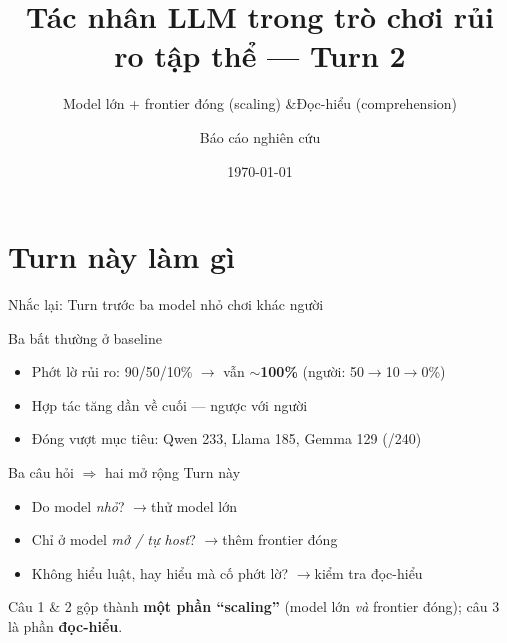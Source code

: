 \documentclass[aspectratio=169,10pt]{beamer}
\title{Tác nhân LLM trong trò chơi rủi ro tập thể --- Turn 2}
\subtitle{Model lớn + frontier đóng (scaling) \enspace\&\enspace Đọc-hiểu (comprehension)}
\date{\today}
\author{Báo cáo nghiên cứu}
\newcommand{\good}[1]{\textcolor{green!45!black}{\textbf{#1}}}   %
\begin{document}
\maketitle

\section{Turn này làm gì}

\begin{frame}{Nhắc lại: Turn trước ba model nhỏ chơi khác người}
  \begin{block}{Ba bất thường ở baseline}
    \begin{itemize}\setlength\itemsep{4pt}
      \item Phớt lờ rủi ro: 90/50/10\% $\to$ vẫn \good{$\sim$100\%} (người: 50$\to$10$\to$0\%)
      \item Hợp tác tăng dần về cuối --- ngược với người
      \item Đóng vượt mục tiêu: Qwen 233, Llama 185, Gemma 129 \;(/240)
    \end{itemize}
  \end{block}
  \begin{exampleblock}{Ba câu hỏi $\Rightarrow$ hai mở rộng Turn này}
    \begin{itemize}\setlength\itemsep{3pt}
      \item Do model \emph{nhỏ}? \quad$\to$\quad \alert{thử model lớn}
      \item Chỉ ở model \emph{mở / tự host}? \quad$\to$\quad \alert{thêm frontier đóng}
      \item Không hiểu luật, hay hiểu mà cố phớt lờ? \quad$\to$\quad \alert{kiểm tra đọc-hiểu}
    \end{itemize}
    {\footnotesize Câu 1 \& 2 gộp thành \textbf{một phần ``scaling''} (model lớn \emph{và} frontier đóng); câu 3 là phần \textbf{đọc-hiểu}.}
  \end{exampleblock}
\end{frame}
\end{document}
